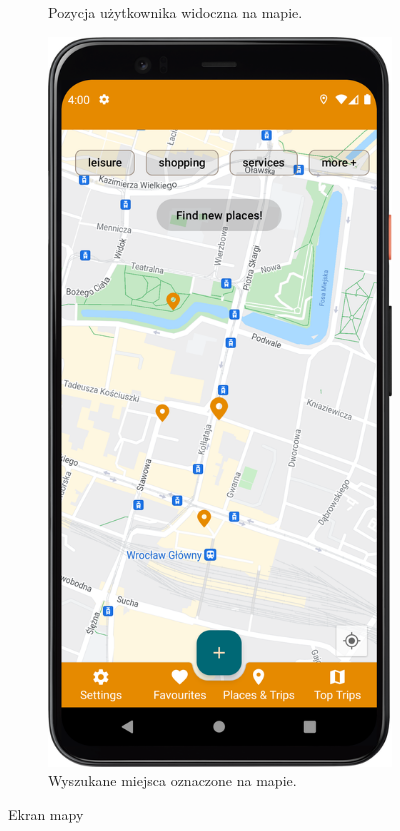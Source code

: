 \begin{figure}[H]
\begin{subfigure}[b]{0.3\textwidth}
                \caption{Pozycja użytkownika widoczna na mapie.\label{map_fragment}}
            \end{subfigure}
            \hfill
            \begin{subfigure}[b]{0.3\textwidth}
                \centering
                \includegraphics[width=\textwidth]{src/app/find_new_places.png}
                \caption{Wyszukane miejsca oznaczone na mapie.\label{find_places}}
            \end{subfigure}
            \caption{Ekran mapy\label{map}}
            \qquad
        \end{figure} 
        \vspace{1cm}
        

